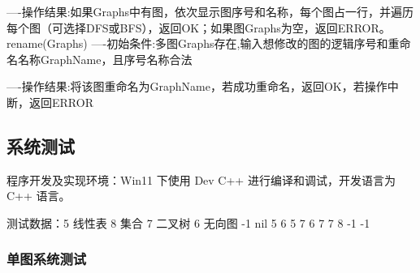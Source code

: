 \documentclass[supercite]{Experimental_Report}
\theoremstyle{definition}
\begin{document}
----操作结果:如果Graphs中有图，依次显示图序号和名称，每个图占一行，并遍历每个图（可选择DFS或BFS），返回OK；如果图Graphs为空，返回ERROR。
rename(Graphs)
----初始条件:多图Graphs存在,输入想修改的图的逻辑序号和重命名名称GraphName，且序号名称合法

----操作结果:将该图重命名为GraphName，若成功重命名，返回OK，若操作中断，返回ERROR 
\subsection{系统测试}
程序开发及实现环境：Win11 下使用 Dev C++ 进行编译和调试，开发语言为 C++ 语言。\par
测试数据：5 线性表 8 集合 7 二叉树 6 无向图 -1 nil  5 6  5 7 6 7 7 8 -1 -1
\subsubsection{单图系统测试}
\end{document}
